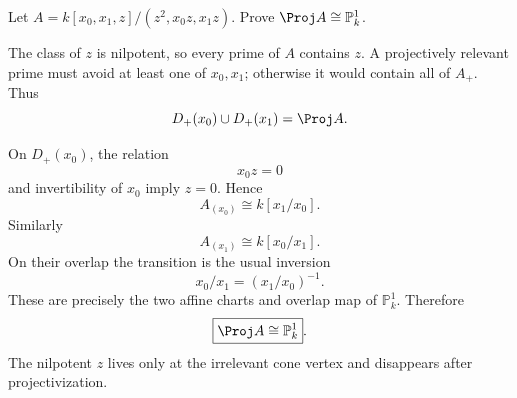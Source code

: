 \begin{problem}\label{prob:vi37-11}
Let \(A=k[x_0,x_1,z]/(z^2,x_0z,x_1z)\). Prove \(\Proj A\cong\mathbb P^1_k\).
\end{problem}

\ifdefined\FullProblemDossiers
\begin{solution}
The class of \(z\) is nilpotent, so every prime of \(A\) contains \(z\). A projectively relevant prime must avoid at least one of \(x_0,x_1\); otherwise it would contain all of \(A_+\). Thus
\[
D_+(x_0)\cup D_+(x_1)=\Proj A.
\]

On \(D_+(x_0)\), the relation
\[
x_0z=0
\]
and invertibility of \(x_0\) imply \(z=0\). Hence
\[
A_{(x_0)}
\cong
k[x_1/x_0].
\]
Similarly
\[
A_{(x_1)}
\cong
k[x_0/x_1].
\]
On their overlap the transition is the usual inversion
\[
x_0/x_1=(x_1/x_0)^{-1}.
\]
These are precisely the two affine charts and overlap map of \(\mathbb P^1_k\). Therefore
\[
\boxed{\Proj A\cong\mathbb P^1_k}.
\]
The nilpotent \(z\) lives only at the irrelevant cone vertex and disappears after projectivization.
\end{solution}
\fi
